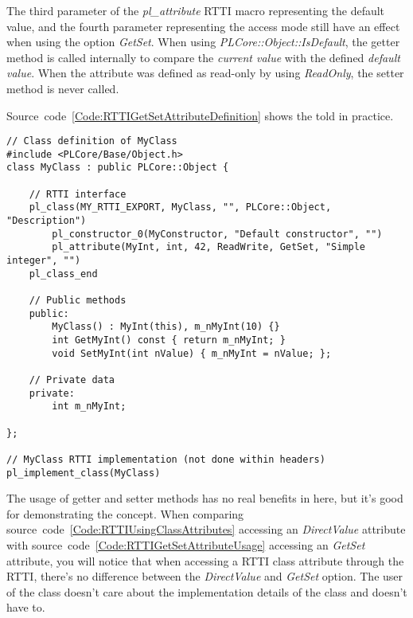 The third parameter of the \emph{pl\_attribute} RTTI macro representing the default value, and the fourth parameter representing the access mode still have an effect when using the option \emph{GetSet}. When using \emph{PLCore::Object::IsDefault}, the getter method is called internally to compare the \emph{current value} with the defined \emph{default value}. When the attribute was defined as read-only by using \emph{ReadOnly}, the setter method is never called.

Source~code~\ref{Code:RTTIGetSetAttributeDefinition} shows the told in practice.
\begin{lstlisting}[label=Code:RTTIGetSetAttributeDefinition,caption={Defining an RTTI class attribute using getter and setter methods}]
// Class definition of MyClass
#include <PLCore/Base/Object.h>
class MyClass : public PLCore::Object {

	// RTTI interface
	pl_class(MY_RTTI_EXPORT, MyClass, "", PLCore::Object, "Description")
		pl_constructor_0(MyConstructor, "Default constructor", "")
		pl_attribute(MyInt, int, 42, ReadWrite, GetSet, "Simple integer", "")
	pl_class_end

	// Public methods
	public:
		MyClass() : MyInt(this), m_nMyInt(10) {}
		int GetMyInt() const { return m_nMyInt; }
		void SetMyInt(int nValue) { m_nMyInt = nValue; };

	// Private data
	private:
		int m_nMyInt;

};

// MyClass RTTI implementation (not done within headers)
pl_implement_class(MyClass)
\end{lstlisting}
The usage of getter and setter methods has no real benefits in here, but it's good for demonstrating the concept. When comparing source~code~\ref{Code:RTTIUsingClassAttributes} accessing an \emph{DirectValue} attribute with source~code~\ref{Code:RTTIGetSetAttributeUsage} accessing an \emph{GetSet} attribute, you will notice that when accessing a RTTI class attribute through the RTTI, there's no difference between the \emph{DirectValue} and \emph{GetSet} option. The user of the class doesn't care about the implementation details of the class and doesn't have to.
